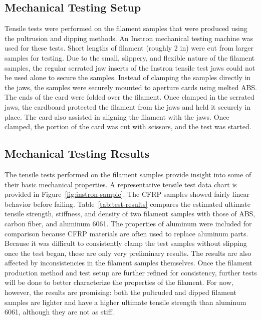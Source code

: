 \subsection{Mechanical Testing Setup}

Tensile tests were performed on the filament samples that were produced using the pultrusion and dipping methods. An Instron mechanical testing machine was used for these tests. Short lengths of filament (roughly 2 in) were cut from larger samples for testing. Due to the small, slippery,  and flexible nature of the filament samples, the regular serrated jaw inserts of the Instron tensile test jaws could not be used alone to secure the samples. Instead of clamping the samples directly in the jaws, the samples were securely mounted to aperture cards using melted ABS. The ends of the card were folded over the filament. Once clamped in the serrated jaws, the cardboard protected the filament from the jaws and held it securely in place. The card also assisted in aligning the filament with the jaws. Once clamped, the portion of the card was cut with scissors, and the test was started.

\subsection{Mechanical Testing Results}

The tensile tests performed on the filament samples provide insight into some of their basic mechanical properties. A representative tensile test data chart is provided in Figure~\ref{fig:instron-sample}. The CFRP samples showed fairly linear behavior before failing. Table~\ref{tab:test-results} compares the estimated ultimate tensile strength, stiffness, and density of two filament samples with those of ABS, carbon fiber, and aluminum 6061. The properties of aluminum were included for comparison because CFRP materials are often used to replace aluminum parts. Because it was difficult to consistently clamp the test samples without slipping once the test began, these are only very preliminary results. The results are also affected by inconsistencies in the filament samples themselves. Once the filament production method and test setup are further refined for consistency, further tests will be done to better characterize the properties of the filament. For now, however, the results are promising: both the pultruded and dipped filament samples are lighter and have a higher ultimate tensile strength than aluminum 6061, although they are not as stiff.

